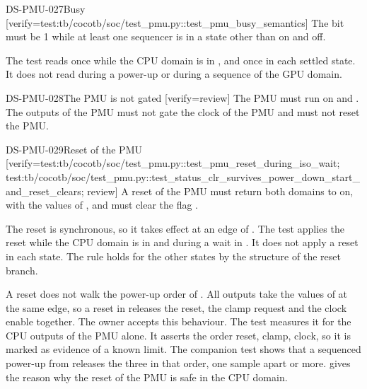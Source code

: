 \begin{requirement}{DS-PMU-027}{Busy}
[verify={test:tb/cocotb/soc/test_pmu.py::test_pmu_busy_semantics}]
The  bit must be 1 while at least one sequencer is in a state other than on and off.
\end{requirement}
\begin{information}
The test reads  once while the CPU domain is in , and once in each settled state. It does not read  during a power-up or during a sequence of the GPU domain.
\end{information}

\begin{requirement}{DS-PMU-028}{The PMU is not gated}
[verify={review}]
The PMU must run on  and . The outputs of the PMU must not gate the clock of the PMU and must not reset the PMU.
\end{requirement}

\begin{requirement}{DS-PMU-029}{Reset of the PMU}
[verify={test:tb/cocotb/soc/test_pmu.py::test_pmu_reset_during_iso_wait; test:tb/cocotb/soc/test_pmu.py::test_status_clr_survives_power_down_start_and_reset_clears; review}]
A reset of the PMU must return both domains to on, with the values of , and must clear the flag .
\end{requirement}
\begin{information}
The reset is synchronous, so it takes effect at an edge of . The test applies the reset while the CPU domain is in  and during a wait in . It does not apply a reset in each state. The rule holds for the other states by the structure of the reset branch.

A reset does not walk the power-up order of . All outputs take the values of  at the same edge, so a reset in  releases the reset, the clamp request and the clock enable together. The owner accepts this behaviour. The test  measures it for the CPU outputs of the PMU alone. It asserts the order reset, clamp, clock, so it is marked  as evidence of a known limit. The companion test  shows that a sequenced power-up from  releases the three in that order, one sample apart or more.  gives the reason why the reset of the PMU is safe in the CPU domain.
\end{information}

